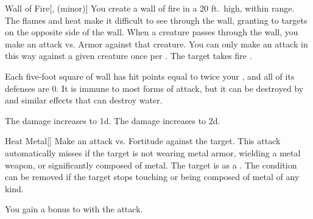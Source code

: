 \lowercase{\hypertarget{spell:Wall of Fire}{}}\label{spell:Wall of Fire}
\begin{freeability}[Rank 4]{\hypertarget{spell:Wall of Fire}{Wall of Fire}}[,  (minor)]
You create a wall of fire in a 20 ft.\ high, \arealarge {} within \rngmed range.
The flames and heat make it difficult to see through the wall, granting  to targets on the opposite side of the wall.
When a creature passes through the wall, you make an attack vs. Armor against that creature.
You can only make an attack in this way against a given creature once per .
\hit The target takes fire .

Each five-foot square of wall has hit points equal to twice your , and all of its defenses are 0.
It is immune to most forms of attack, but it can be destroyed by  and similar effects that can destroy water.

\rankline
{} The damage increases to  \plus1d.
 The damage increases to  \plus2d.
\end{freeability}
\vspace{0.25em}



\lowercase{\hypertarget{spell:Heat Metal}{}}\label{spell:Heat Metal}
\begin{freeability}[Rank 5]{\hypertarget{spell:Heat Metal}{Heat Metal}}[]
Make an attack vs. Fortitude against the target.
This attack automatically misses if the target is not wearing metal armor, wielding a metal weapon, or significantly composed of metal.
\hit The target is  as a .
The condition can be removed if the target stops touching or being composed of metal of any kind.

\rankline
{} You gain a  bonus to  with the attack.
\end{freeability}
\vspace{0.25em}


